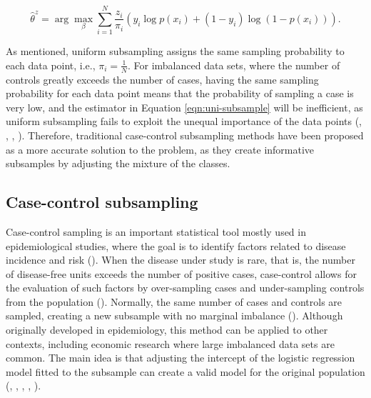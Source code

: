 \begin{equation}
    \widehat{\theta}^{z} = \arg \max_\beta \sum_{i=1}^N \frac{z_i}{\pi_i} \left(y_i \log p\left(x_i\right)+\left(1-y_i\right) \log \left(1-p\left(x_i \right)\right)\right).
    \label{eqn:uni-subsample}
\end{equation}

As mentioned, uniform subsampling assigns the same sampling probability to each data point, i.e., $\pi_i=\frac{1}{N}$. For imbalanced data sets, where the number of controls greatly exceeds the number of cases, having the same sampling probability for each data point means that the probability of sampling a case is very low, and the estimator in Equation \ref{eqn:uni-subsample} will be inefficient, as uniform subsampling fails to exploit the  unequal importance of the data points (\cite{han2020local}, \cite{wang2020rare}, \cite{yao2021review}, \cite{hastie2014}). Therefore, traditional case-control subsampling methods have been proposed as a more accurate solution to the problem, as they create informative subsamples by adjusting the mixture of the classes. 


\subsection{Case-control subsampling}
\label{sec:cc}

Case-control sampling is an important statistical tool mostly used in epidemiological studies, where the goal is to identify factors related to disease incidence and risk (\cite{prentice1979}). When the disease under study is rare, that is, the number of disease-free units exceeds the number of  positive cases, case-control allows for the evaluation of such factors by over-sampling cases and under-sampling controls from the population (\cite{borgan2018handbook}). Normally, the same number of cases and controls are sampled, creating a new subsample with no marginal imbalance (\cite{hastie2014}). Although originally developed in epidemiology, this method can be applied to other contexts, including economic research where large imbalanced data sets are common. The main idea is that adjusting the intercept of the logistic regression model fitted to the subsample can create a valid model for the original population (\cite{anderson1972}, \cite{prentice1979}, \cite{scott1986}, \cite{king2001logistic}, \cite{hastie2014}).

